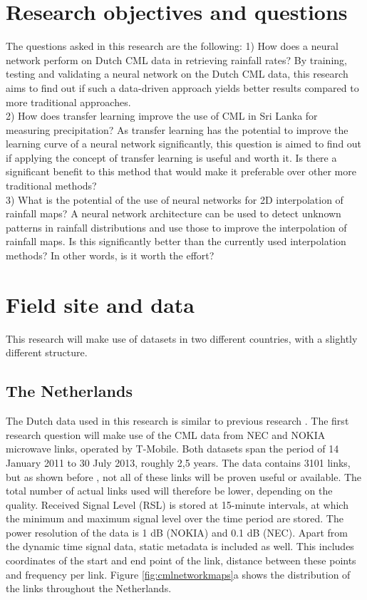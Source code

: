 \documentclass[twocolumn, 10pt, a4paper]{article}
\begin{document}
	
	\section{Research objectives and questions}
	
	The questions asked in this research are the following:
	1) How does a neural network perform on Dutch CML data in retrieving rainfall rates? By training, testing and validating a neural network on the Dutch CML data, this research aims to find out if such a data-driven approach yields better results compared to more traditional approaches.\\
	2) How does transfer learning improve the use of CML in Sri Lanka for measuring precipitation? As transfer learning has the potential to improve the learning curve of a neural network significantly, this question is aimed to find out if applying the concept of transfer learning is useful and worth it. Is there a significant benefit to this method that would make it preferable over other more traditional methods?\\
	3) What is the potential of the use of neural networks for 2D interpolation of rainfall maps? A neural network architecture can be used to detect unknown patterns in rainfall distributions and use those to improve the interpolation of rainfall maps. Is this significantly better than the currently used interpolation methods? In other words, is it worth the effort?\\
		
	\section{Field site and data}
	This research will make use of datasets in two different countries, with a slightly different structure.
	\subsection{The Netherlands}
	The Dutch data used in this research is similar to previous research \cite{Overeem2016}.
	The first research question will make use of the CML data from NEC and NOKIA microwave links, operated by T-Mobile. Both datasets span the period of 14 January 2011 to 30 July 2013, roughly 2,5 years. The data contains 3101 links, but as shown before \cite{Overeem2016}, not all of these links will be proven useful or available. The total number of actual links used will therefore be lower, depending on the quality. Received Signal Level (RSL)  is stored at 15-minute intervals, at which the minimum and maximum signal level over the time period are stored. The power resolution of the data is 1 dB (NOKIA) and 0.1 dB (NEC). 
	Apart from the dynamic time signal data, static metadata is included as well. This includes coordinates of the start and end point of the link, distance between these points and frequency per link. Figure \ref{fig:cmlnetworkmaps}a shows the distribution of the links throughout the Netherlands.
	
\end{document}
